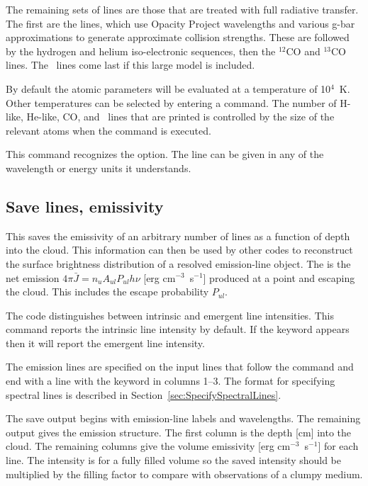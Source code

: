 The remaining sets of lines are those that are treated with full radiative
transfer.
The first are the  lines, which use Opacity Project
wavelengths and various g-bar approximations to generate approximate
collision strengths.   These are followed by the
hydrogen and helium iso-electronic sequences, then the $^{12}$CO and $^{13}$CO lines.
The \htwo\ lines come last if this large model is included.

By default the atomic parameters will be evaluated at a temperature of
10$^4$~K.  Other temperatures can be selected by entering a
 command.
The number of H-like, He-like, CO,
and \htwo\ lines that are printed is controlled by the size of the
relevant atoms when the  command is executed.

This command recognizes the  option.
The line
can be given in any of the wavelength or energy units
it understands.

\subsection{Save lines, emissivity}

This saves the emissivity of an arbitrary number of lines as a function
of depth into the cloud.  This information can then be used by other codes
to reconstruct the surface brightness distribution of a resolved
emission-line object.  The 
is the net emission
$4\pi \bar J = n_u A_{ul} P_{ul} h\nu $
[erg cm$^{-3}$~s$^{-1}$] produced at a point and escaping the cloud.
This includes the escape probability $P_{ul}$.

The code distinguishes between intrinsic and emergent
line intensities.
This command reports the intrinsic line intensity by default.
If the keyword  appears then it will
report the emergent line intensity.

The emission lines are specified on the input lines that follow the
command and end with a line with the keyword  in columns 1--3.
The format for specifying spectral lines is described in Section~\ref{sec:SpecifySpectralLines}.

The save output begins with emission-line labels and wavelengths.  The
remaining output gives the emission structure.  The first column is the
depth [cm] into the cloud.  The remaining columns give the volume emissivity
[erg cm$^{-3}$~s$^{-1}$] for each line.  The intensity is for a fully filled volume
so the saved intensity should be multiplied by the filling factor to
compare with observations of a clumpy medium.

